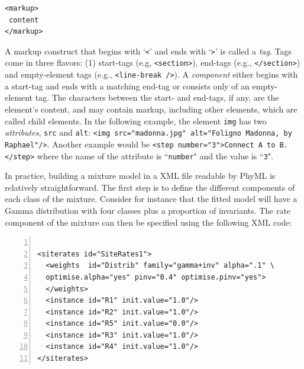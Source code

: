 \documentclass[a4paper,12pt]{article}
\newcommand{\x}[1]{\texttt{#1}}
\begin{document}
\vspace{0.2cm}
\begin{Verbatim}[frame=single, label=XML markup and content example, samepage=true,
  baselinestretch=0.5, fontsize=\small]
<markup>
 content
</markup>
\end{Verbatim}

A markup construct that begins  with `\x{<}' and ends with `\x{>}' is called  a {\em tag}. Tags come
in  three  flavors:  (1)  start-tags  (e.g,  \x{<section>}),  end-tags  (e.g.,  \x{</section>})  and
empty-element tags (e.g., \x{<line-break />}). A {\em  component} either begins with a start-tag and
ends with a  matching end-tag or consists only  of an empty-element tag. The  characters between the
start- and  end-tags, if any,  are the  element's content, and  may contain markup,  including other
elements, which are  called child elements.  In  the following example, the element  \x{img} has two
{\em  attributes},  \x{src}   and  \x{alt}:  \x{<img  src="madonna.jpg"   alt="Foligno  Madonna,  by
Raphael"/>}. Another example would be \x{<step number="3">Connect  A to B.</step>} where the name of
the attribute is ``\x{number}" and the value is ``\x{3}".

In  practice,  building   a  mixture  model  in   a  XML  file  readable  by   PhyML  is  relatively
straightforward.  The first  step  is  to define  the  different components  of  each  class of  the
mixture.  Consider for  instance that  the fitted  model will  have a  Gamma distribution  with four
classes plus  a proportion of invariants.  The rate component of  the mixture can then  be specified
using the following XML code:

\vspace{0.2cm}
\begin{Verbatim}[frame=single, label=$\Gamma4$+I rates, samepage=true, baselinestretch=0.5,
  fontsize=\small, numbers=left]

<siterates id="SiteRates1">
  <weights  id="Distrib" family="gamma+inv" alpha=".1" \
  optimise.alpha="yes" pinv="0.4" optimise.pinv="yes">
  </weights>
  <instance id="R1" init.value="1.0"/>
  <instance id="R2" init.value="1.0"/>
  <instance id="R5" init.value="0.0"/>
  <instance id="R3" init.value="1.0"/>
  <instance id="R4" init.value="1.0"/>
</siterates>

\end{Verbatim}
\end{document}

